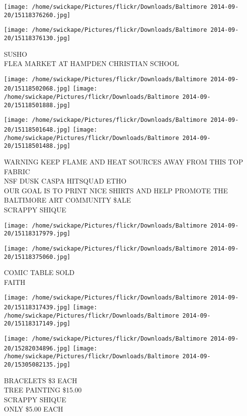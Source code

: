 \documentclass[10pt,letterpaper]{article}
\begin{document}
\texttt{[image: /home/swickape/Pictures/flickr/Downloads/Baltimore 2014-09-20/15118376260.jpg]}

\vspace{0.25in}
\texttt{[image: /home/swickape/Pictures/flickr/Downloads/Baltimore 2014-09-20/15118376130.jpg]}

SUSHO\\
FLEA MARKET AT HAMPDEN CHRISTIAN SCHOOL\\
\pagebreak

\texttt{[image: /home/swickape/Pictures/flickr/Downloads/Baltimore 2014-09-20/15118502068.jpg]}
\texttt{[image: /home/swickape/Pictures/flickr/Downloads/Baltimore 2014-09-20/15118501888.jpg]}

\texttt{[image: /home/swickape/Pictures/flickr/Downloads/Baltimore 2014-09-20/15118501648.jpg]}
\texttt{[image: /home/swickape/Pictures/flickr/Downloads/Baltimore 2014-09-20/15118501488.jpg]}

WARNING KEEP FLAME AND HEAT SOURCES AWAY FROM THIS TOP FABRIC\\
NSF DUSK CASPA HITSQUAD ETHO\\
OUR GOAL IS TO PRINT NICE SHIRTS AND HELP PROMOTE THE BALTIMORE ART COMMUNITY \$ALE\\
SCRAPPY SHIQUE\\
\pagebreak

\texttt{[image: /home/swickape/Pictures/flickr/Downloads/Baltimore 2014-09-20/15118317979.jpg]}

\vspace{0.25in}
\texttt{[image: /home/swickape/Pictures/flickr/Downloads/Baltimore 2014-09-20/15118375060.jpg]}

COMIC TABLE SOLD\\
FAITH\\
\pagebreak

\texttt{[image: /home/swickape/Pictures/flickr/Downloads/Baltimore 2014-09-20/15118317439.jpg]}
\texttt{[image: /home/swickape/Pictures/flickr/Downloads/Baltimore 2014-09-20/15118317149.jpg]}

\texttt{[image: /home/swickape/Pictures/flickr/Downloads/Baltimore 2014-09-20/15282034896.jpg]}
\texttt{[image: /home/swickape/Pictures/flickr/Downloads/Baltimore 2014-09-20/15305082135.jpg]}

BRACELETS \$3 EACH\\
TREE PAINTING \$15.00\\
SCRAPPY SHIQUE\\
ONLY \$5.00 EACH\\
\pagebreak
\end{document}
